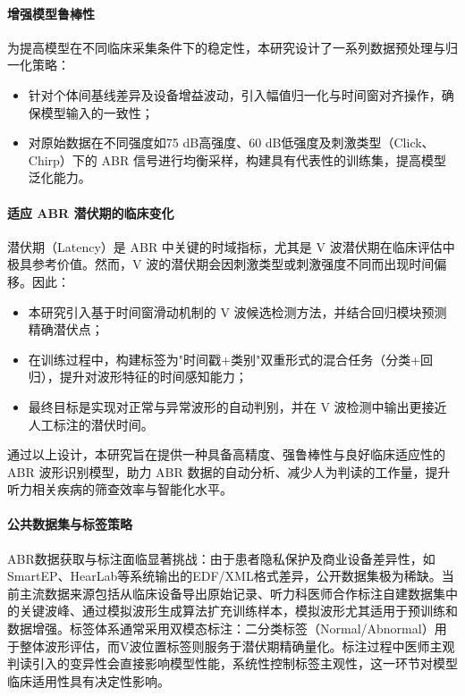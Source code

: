 \paragraph*{增强模型鲁棒性}
为提高模型在不同临床采集条件下的稳定性，本研究设计了一系列数据预处理与归一化策略：

\begin{itemize}
    \item 针对个体间基线差异及设备增益波动，引入幅值归一化与时间窗对齐操作，确保模型输入的一致性；
    \item 对原始数据在不同强度如75 dB高强度、60 dB低强度及刺激类型（Click、Chirp）下的 ABR 信号进行均衡采样，构建具有代表性的训练集，提高模型泛化能力。
\end{itemize}

\paragraph*{适应 ABR 潜伏期的临床变化}
潜伏期（Latency）是 ABR 中关键的时域指标，尤其是 V 波潜伏期在临床评估中极具参考价值。然而，V 波的潜伏期会因刺激类型或刺激强度不同而出现时间偏移。因此：

\begin{itemize}
    \item 本研究引入基于时间窗滑动机制的 V 波候选检测方法，并结合回归模块预测精确潜伏点；
    \item 在训练过程中，构建标签为"时间戳+类别"双重形式的混合任务（分类+回归），提升对波形特征的时间感知能力；
    \item 最终目标是实现对正常与异常波形的自动判别，并在 V 波检测中输出更接近人工标注的潜伏时间。
\end{itemize}

通过以上设计，本研究旨在提供一种具备高精度、强鲁棒性与良好临床适应性的 ABR 波形识别模型，助力 ABR 数据的自动分析、减少人为判读的工作量，提升听力相关疾病的筛查效率与智能化水平。

\paragraph*{公共数据集与标签策略}
ABR数据获取与标注面临显著挑战：由于患者隐私保护及商业设备差异性，如SmartEP、HearLab等系统输出的EDF/XML格式差异，公开数据集极为稀缺。当前主流数据来源包括从临床设备导出原始记录、听力科医师合作标注自建数据集中的关键波峰、通过模拟波形生成算法扩充训练样本，模拟波形尤其适用于预训练和数据增强。标签体系通常采用双模态标注：二分类标签（Normal/Abnormal）用于整体波形评估，而V波位置标签则服务于潜伏期精确量化。标注过程中医师主观判读引入的变异性会直接影响模型性能，系统性控制标签主观性，这一环节对模型临床适用性具有决定性影响。

